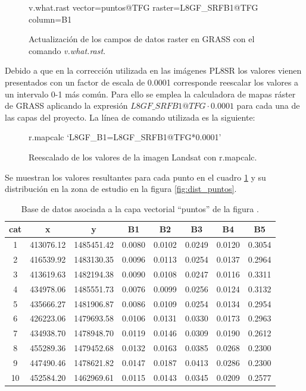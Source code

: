 \begin{figure}[ht]
\centering
\begin{boxedverbatim}
	v.what.rast vector=puntos@TFG raster=L8GF_SRFB1@TFG column=B1
\end{boxedverbatim}
\caption[Actualización de los datos raster]{Actualización de los campos de datos raster en GRASS con el comando \textit{v.what.rast}.}
\label{fig:v.what.rast}
\end{figure}

Debido a que en la corrección utilizada en las imágenes \ac{PL8SR} los valores vienen presentados con un factor de escala de 0.0001 \citep{USGS2015} corresponde reescalar los valores a un intervalo 0-1 más común. Para ello se emplea la calculadora de mapas ráster de GRASS aplicando la expresión $L8GF\_SRFB1@TFG \cdot 0.0001$ para cada una de las capas del proyecto. La línea de comando utilizada es la siguiente:

\begin{figure}[ht]
	\centering
	\begin{boxedverbatim}
	r.mapcalc `L8GF_B1=L8GF_SRFB1@TFG*0.0001'
	\end{boxedverbatim}
	\caption[Reescalado de valores]{Reescalado de los valores de la imagen Landsat con r.mapcalc.}
\end{figure}

Se muestran los valores resultantes para cada punto en el cuadro \ref{tab:tabla_puntos} y su distribución en la zona de estudio en la figura \ref{fig:dist_puntos}.\Sep

\begin{table}[ht]
	\centering
	\caption[Base de datos de puntos de comprobación]{Base de datos asociada a la capa vectorial ``puntos'' de la figura .}
	\begin{tabular}{@{}cccccccc@{}}
	\toprule[0.4mm]
	cat & x & y & B1 & B2 & B3 & B4 & B5\\
	\midrule
	1 & 413076.12 & 1485451.42 & 0.0080 & 0.0102 & 0.0249 & 0.0120 & 0.3054\\
	2 & 416539.92 & 1483130.35 & 0.0096 & 0.0113 & 0.0254 & 0.0137 & 0.2964\\
	3 & 413619.63 & 1482194.38 & 0.0090 & 0.0108 & 0.0247 & 0.0116 & 0.3311\\
	4 & 434978.06 & 1485551.73 & 0.0076 & 0.0099 & 0.0256 & 0.0124 & 0.3132\\
	5 & 435666.27 & 1481906.87 & 0.0086 & 0.0109 & 0.0254 & 0.0134 & 0.2954\\
	6 & 426223.06 & 1479693.58 & 0.0106 & 0.0131 & 0.0330 & 0.0173 & 0.2963\\
	7 & 434938.70 & 1478948.70 & 0.0119 & 0.0146 & 0.0309 & 0.0190 & 0.2612\\
	8 & 455289.36 & 1479452.68 & 0.0132 & 0.0163 & 0.0385 & 0.0268 & 0.2300\\
	9 & 447490.46 & 1478621.82 & 0.0147 & 0.0187 & 0.0413 & 0.0286 & 0.2300\\
	10 & 452584.20 & 1462969.61 & 0.0115 & 0.0143 & 0.0345 & 0.0209 & 0.2577\\
	\bottomrule[0.4mm]
	\end{tabular}
	\label{tab:tabla_puntos}
\end{table}

